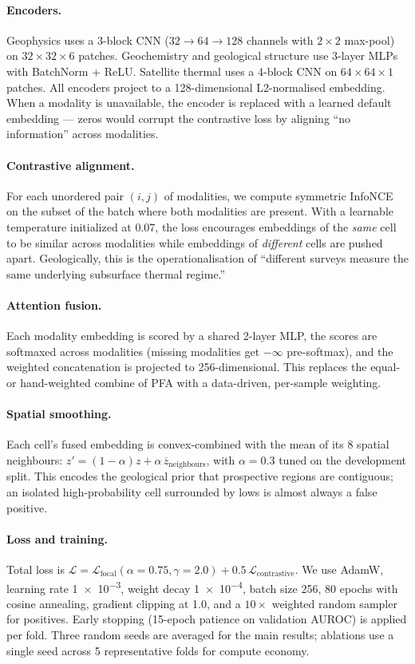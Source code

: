 \documentclass[review,12pt]{elsarticle}
\begin{document}
\paragraph{Encoders.} Geophysics uses a 3-block CNN ($32 \to 64 \to 128$ channels with $2\times2$ max-pool) on $32\times32\times6$ patches. Geochemistry and geological structure use 3-layer MLPs with BatchNorm + ReLU. Satellite thermal uses a 4-block CNN on $64\times64\times1$ patches. All encoders project to a 128-dimensional L2-normalised embedding. When a modality is unavailable, the encoder is replaced with a learned default embedding — zeros would corrupt the contrastive loss by aligning ``no information'' across modalities.

\paragraph{Contrastive alignment.} For each unordered pair $(i,j)$ of modalities, we compute symmetric InfoNCE on the subset of the batch where both modalities are present. With a learnable temperature initialized at 0.07, the loss encourages embeddings of the \emph{same} cell to be similar across modalities while embeddings of \emph{different} cells are pushed apart. Geologically, this is the operationalisation of ``different surveys measure the same underlying subsurface thermal regime.''

\paragraph{Attention fusion.} Each modality embedding is scored by a shared 2-layer MLP, the scores are softmaxed across modalities (missing modalities get $-\infty$ pre-softmax), and the weighted concatenation is projected to 256-dimensional. This replaces the equal- or hand-weighted combine of PFA with a data-driven, per-sample weighting.

\paragraph{Spatial smoothing.} Each cell's fused embedding is convex-combined with the mean of its 8 spatial neighbours: $z' = (1-\alpha) z + \alpha\,\overline{z}_{\text{neighbours}}$, with $\alpha = 0.3$ tuned on the development split. This encodes the geological prior that prospective regions are contiguous; an isolated high-probability cell surrounded by lows is almost always a false positive.

\paragraph{Loss and training.} Total loss is $\mathcal{L} = \mathcal{L}_\text{focal}(\alpha{=}0.75, \gamma{=}2.0) + 0.5\,\mathcal{L}_\text{contrastive}$. We use AdamW, learning rate \num{1e-3}, weight decay \num{1e-4}, batch size 256, 80 epochs with cosine annealing, gradient clipping at 1.0, and a $10\times$ weighted random sampler for positives. Early stopping (15-epoch patience on validation AUROC) is applied per fold. Three random seeds are averaged for the main results; ablations use a single seed across 5 representative folds for compute economy.
\end{document}
